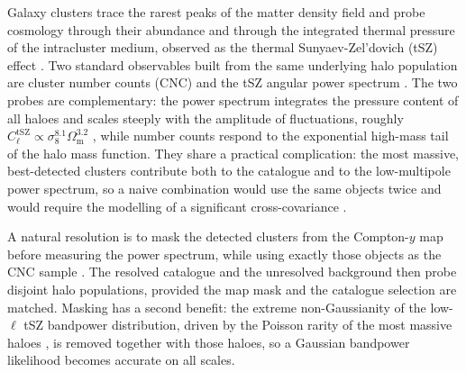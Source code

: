\documentclass[aps,prd,twocolumn,superscriptaddress,nofootinbib,floatfix]{revtex4-2}
\begin{document}
Galaxy clusters trace the rarest peaks of the matter density field and probe cosmology through their abundance and through the integrated thermal pressure of the intracluster medium, observed as the thermal Sunyaev-Zel'dovich (tSZ) effect \citep{1972CoASP...4..173S}.
Two standard observables built from the same underlying halo population are cluster number counts (CNC) \citep[e.g.][]{Allen:2011zs,Pratt:2019cnc,Planck:2015lwi,Bocquet2024b,Zubeldia2019} and the tSZ angular power spectrum \citep[e.g.][]{Komatsu_1999,Komatsu:2002wc,Planck:2015vgm,Bolliet:2017lha}.
The two probes are complementary: the power spectrum integrates the pressure content of all haloes and scales steeply with the amplitude of fluctuations, roughly $C_\ell^{\mathrm{tSZ}} \propto \sigma_8^{8.1} \Omega_{\mathrm{m}}^{3.2}$ \citep{Komatsu:2002wc,Bolliet:2017lha}, while number counts respond to the exponential high-mass tail of the halo mass function.
They share a practical complication: the most massive, best-detected clusters contribute both to the catalogue and to the low-multipole power spectrum, so a naive combination would use the same objects twice and would require the modelling of a significant cross-covariance \citep{Hurier2017}.

A natural resolution is to mask the detected clusters from the Compton-$y$ map before measuring the power spectrum, while using exactly those objects as the CNC sample \citep{Rotti:2020rdl}.
The resolved catalogue and the unresolved background then probe disjoint halo populations, provided the map mask and the catalogue selection are matched.
Masking has a second benefit: the extreme non-Gaussianity of the low-$\ell$ tSZ bandpower distribution, driven by the Poisson rarity of the most massive haloes \citep{Zhang:2007psa,Horowitz:2017dsh}, is removed together with those haloes, so a Gaussian bandpower likelihood becomes accurate on all scales.
\end{document}
